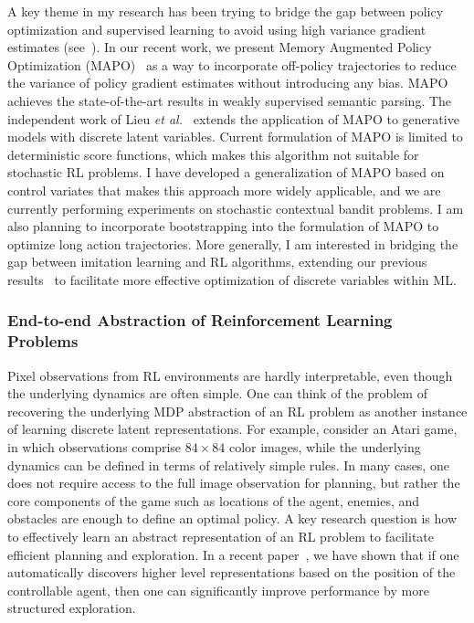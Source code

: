 \documentclass[a4paper, 10pt]{article}
\begin{document}
A key theme in my research has been trying to bridge the gap between
policy optimization and supervised learning to avoid using high
variance gradient estimates (see~\cite{raml,pqt2018,ocd,dvn,mapo}).
In our recent work, we present Memory Augmented Policy Optimization
(MAPO)~\cite{mapo} as a way to incorporate off-policy trajectories to
reduce the variance of policy gradient estimates without introducing
any bias. MAPO achieves the state-of-the-art results in weakly
supervised semantic parsing. The independent work of Lieu {\em et
  al.}~\cite{liu2018rao} extends the application of MAPO to generative
models with discrete latent variables. Current formulation of MAPO is
limited to deterministic score functions, which makes this algorithm
not suitable for stochastic RL problems. I have developed a
generalization of MAPO based on control variates that makes this
approach more widely applicable, and we are currently performing
experiments on stochastic contextual bandit problems. I am also
planning to incorporate bootstrapping into the formulation of MAPO to
optimize long action trajectories. More generally, I am interested in
bridging the gap between imitation learning and RL algorithms,
extending our previous results~\cite{ocd} to facilitate more effective
optimization of discrete variables within ML.

\vspace*{-.2cm}
\subsubsection*{End-to-end Abstraction of Reinforcement Learning Problems}
\vspace*{-.1cm}

\hspace{\parindent} Pixel observations from RL environments are hardly
interpretable, even though the underlying dynamics are often
simple. One can think of the problem of recovering the underlying MDP
abstraction of an RL problem as another instance of learning discrete
latent representations. For example, consider an Atari game, in which
observations comprise $84\!\times\!84$ color images, while the
underlying dynamics can be defined in terms of relatively simple
rules. In many cases, one does not require access to the full image
observation for planning, but rather the core components of the game
such as locations of the agent, enemies, and obstacles are enough
to define an optimal policy. A key research question is how to
effectively learn an abstract representation of an RL problem to
facilitate efficient planning and exploration. In a recent
paper~\cite{coex}, we have shown that if one automatically discovers
higher level representations based on the position of the controllable
agent, then one can significantly improve performance by more
structured exploration.
\end{document}
